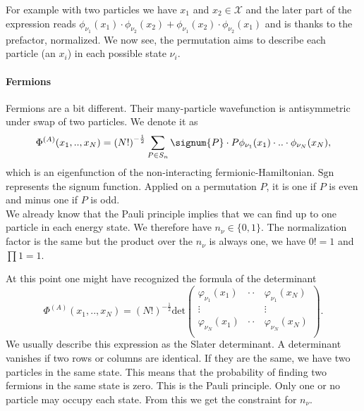 \documentclass[../main.tex]{subfile}
\begin{document}
For example with two particles we have $x_1$ and $x_2\in\mathcal{X}$ and the later part of the expression reads 
$\phi_{\nu_1}(x_1) \cdot \phi_{\nu_2}(x_2) + \phi_{\nu_1}(x_2) \cdot \phi_{\nu_2}(x_1)$ and is thanks to the prefactor, normalized.
We now see, the permutation aims to describe each particle (an $x_i$) in each possible state $\nu_i$.

\paragraph{Fermions}$~$\\

Fermions are a bit different. Their many-particle wavefunction is antisymmetric under swap of two particles. We denote it as
\[
    \Phi^{(A)}(x_1,..,x_N) = \left(N!\right)^{-\frac{1}{2}} \sum_{P\in S_n} \signum{P}\cdot P \phi_{\nu_1}(x_1)\cdot ..\cdot \phi_{\nu_N}(x_N),
\]
which is an eigenfunction of the non-interacting fermionic-Hamiltonian.
$\text{Sgn}$ represents the signum function. Applied on a permutation $P$, it is one if $P$ is even and minus one if $P$ is odd.\\
We already know that the Pauli principle implies that we can find up to one particle in each energy state. We therefore have $n_\nu \in \{0,1\}$. The normalization
factor is the same but the product over the $n_{\nu}$ is always one, we have $0!=1$ and $\prod 1 = 1$.

At this point one might have recognized the formula of the determinant
\[
    \Phi^{(A)}(x_1,..,x_N) = \left(N!\right)^{-\frac{1}{2}} \text{det}\begin{pmatrix}
        \varphi_{\nu_1}(x_1)& \cdot\cdot &\varphi_{\nu_1}(x_N)\\
        \vdots&  &\vdots\\
        \varphi_{\nu_N}(x_1)& \cdot\cdot &\varphi_{\nu_N}(x_N)\\

    \end{pmatrix}.
\]
We usually describe this expression as the Slater determinant. A determinant vanishes if two rows or columns are identical. If they are the same, we have two particles 
in the same state. This means that the probability of finding two fermions in the same state is zero.
This is the Pauli principle. Only one or no particle may occupy each state. From this we get the constraint for $n_{\nu}$.\\
\end{document}
